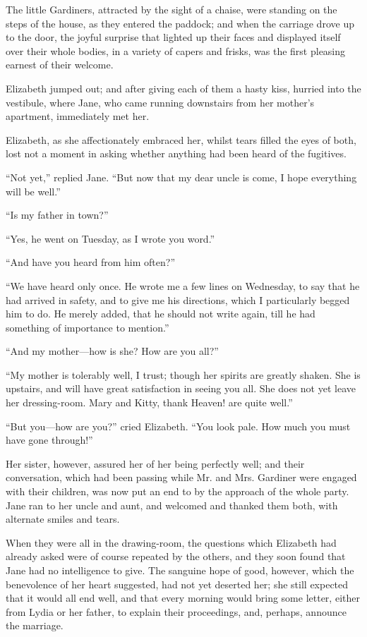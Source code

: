 \documentclass[12pt,openright]{book}
\begin{document}
The little Gardiners, attracted by the sight of a chaise, were standing on the steps of the house, as they entered the paddock; and when the carriage drove up to the door, the joyful surprise that lighted up their faces and displayed itself over their whole bodies, in a variety of capers and frisks, was the first pleasing earnest of their welcome.

Elizabeth jumped out; and after giving each of them a hasty kiss, hurried into the vestibule, where Jane, who came running downstairs from her mother’s apartment, immediately met her.

Elizabeth, as she affectionately embraced her, whilst tears filled the eyes of both, lost not a moment in asking whether anything had been heard of the fugitives.

“Not yet,” replied Jane. “But now that my dear uncle is come, I hope everything will be well.”

“Is my father in town?”

“Yes, he went on Tuesday, as I wrote you word.”

“And have you heard from him often?”

“We have heard only once. He wrote me a few lines on Wednesday, to say that he had arrived in safety, and to give me his directions, which I particularly begged him to do. He merely added, that he should not write again, till he had something of importance to mention.”

“And my mother—how is she? How are you all?”

“My mother is tolerably well, I trust; though her spirits are greatly shaken. She is upstairs, and will have great satisfaction in seeing you all. She does not yet leave her dressing-room. Mary and Kitty, thank Heaven! are quite well.”

“But you—how are you?” cried Elizabeth. “You look pale. How much you must have gone through!”

Her sister, however, assured her of her being perfectly well; and their conversation, which had been passing while Mr. and Mrs. Gardiner were engaged with their children, was now put an end to by the approach of the whole party. Jane ran to her uncle and aunt, and welcomed and thanked them both, with alternate smiles and tears.

When they were all in the drawing-room, the questions which Elizabeth had already asked were of course repeated by the others, and they soon found that Jane had no intelligence to give. The sanguine hope of good, however, which the benevolence of her heart suggested, had not yet deserted her; she still expected that it would all end well, and that every morning would bring some letter, either from Lydia or her father, to explain their proceedings, and, perhaps, announce the marriage.
\end{document}
